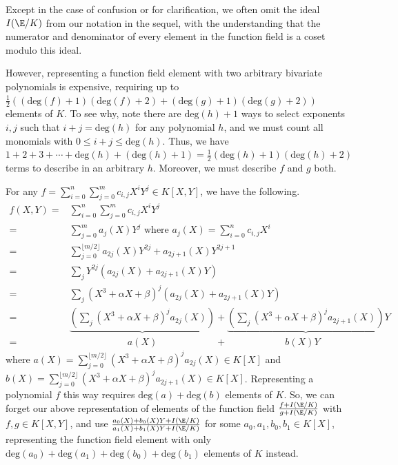 \documentclass[11pt,letterpaper]{article}
\theoremstyle{definition}
\newcommand{\6}{\mathbf}
\newcommand{\7}{\mathcal}
\begin{document}
Except in the case of confusion or for clarification, we often omit the ideal $I(\E/K)$ from our notation in the sequel, with the understanding that the numerator and denominator of every element in the function field is a coset modulo this ideal.

However, representing a function field element with two arbitrary bivariate polynomials is expensive, requiring up to $\frac{1}{2}\left((\text{deg}(f)+1)(\text{deg}(f)+2) + (\text{deg}(g)+1)(\text{deg}(g)+2)\right)$ elements of $K$. To see why, note there are $\text{deg}(h)+1$ ways to select exponents $i, j$ such that $i+j = \text{deg}(h)$ for any polynomial $h$, and we must count all monomials with $0 \leq i + j \leq \text{deg}(h)$. Thus, we have $1 + 2 + 3 + \cdots + \text{deg}(h) + (\text{deg}(h)+1) = \frac{1}{2}(\text{deg}(h)+1)(\text{deg}(h)+2)$ terms to describe in an arbitrary $h$. Moreover, we must describe $f$ and $g$ both. 

For any $f = \sum_{i=0}^{n}\sum_{j=0}^{m} c_{i,j} X^i Y^j \in K[X,Y]$, we have the following.
\begin{align}
f(X,Y) =& \sum_{i=0}^{n}\sum_{j=0}^{m} c_{i,j} X^i Y^j \\
=& \sum_{j=0}^{m} a_{j}(X)Y^j\text{ where }a_j(X) = \sum_{i=0}^{n} c_{i,j}X^i  \\
=& \sum_{j=0}^{\lfloor m/2\rfloor} a_{2j}(X)Y^{2j} + a_{2j+1}(X)Y^{2j+1} \\
=& \sum_{j} Y^{2j}\left(a_{2j}(X) + a_{2j+1}(X)Y\right)\\
=& \sum_j \left(X^3 + \alpha X + \beta\right)^j\left(a_{2j}(X) + a_{2j+1}(X)Y\right) \\
=& \underbrace{\left(\sum_j \left(X^3 + \alpha X + \beta\right)^ja_{2j}(X)\right)}{} + \underbrace{\left(\sum_j \left(X^3 + \alpha X + \beta\right)^ja_{2j+1}(X)\right)}{}Y \\
=& \quad \quad \quad \quad \quad \quad a(X)  \quad \quad \quad \quad \quad \quad + \quad \quad \quad \quad \quad \quad b(X)Y
\end{align} where $a(X) = \sum_{j=0}^{\lfloor m/2\rfloor} (X^3 + \alpha X + \beta)^j a_{2j}(X) \in K[X]$ and $b(X) = \sum_{j=0}^{\lfloor m/2\rfloor} (X^3 + \alpha X + \beta)^j a_{2j+1}(X) \in K[X]$. Representing a polynomial $f$ this way requires $\text{deg}(a) + \text{deg}(b)$ elements of $K$. So, we can forget our above representation of elements of the function field $\frac{f+I(\E/K)}{g+I(\E/K)}$ with $f, g \in K[X,Y]$, and use $\frac{a_0(X) + b_0(X)Y + I(\E/K)}{a_1(X) + b_1(X)Y + I(\E/K)}$ for some $a_0, a_1, b_0, b_1 \in K\left[X\right]$, representing the function field element with only $\text{deg}(a_0)+\text{deg}(a_1)+\text{deg}(b_0)+\text{deg}(b_1)$ elements of $K$ instead. 
\end{document}
